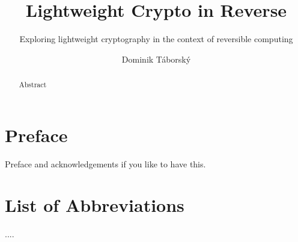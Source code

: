 \documentclass[a4paper,10pt,openright]{memoir}
\begin{document}
\thesiscomment{} %
\title{Lightweight Crypto in Reverse}
\subtitle{Exploring lightweight cryptography in the context of reversible computing}
\author{Dominik Táborský}

\pagestyle{plain}
\maketitle

\cleardoublepage
{}
\setcounter{page}{3}

\cleardoublepage
\pagestyle{plain}
\begin{abstract}
Abstract
\end{abstract}


\cleardoublepage
{}
\tableofcontents*


\cleardoublepage
{}
\setcounter{page}{1}


%
\chapter*{Preface}

Preface and acknowledgements if you like to have this.



\cleardoublepage
%
\chapter*{List of Abbreviations}

....


\cleardoublepage
\end{document}
